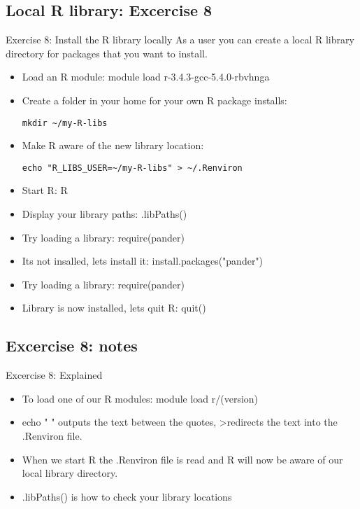 \subsection{Local R library: Excercise 8}
\begin{frame}[fragile]{Exercise 8: Install the R library locally}
As a user you can create a local R library directory for packages that you want to install. 
\begin{itemize}
\item Load an R module: 
module load r-3.4.3-gcc-5.4.0-rbvhnga
\item Create a folder in your home for your own R package installs:
\begin{verbatim}
mkdir ~/my-R-libs
\end{verbatim}
\item Make R aware of the new library location:
\begin{verbatim}
echo "R_LIBS_USER=~/my-R-libs" > ~/.Renviron
\end{verbatim}
\item Start R:
R
\item Display your library paths:
.libPaths()
\item Try loading a library:
require(pander)
\item Its not insalled, lets install it:
install.packages("pander")
\item Try loading a library:
require(pander)
\item Library is now installed, lets quit R:
quit()
\end{itemize}
\end{frame}

\subsection{Excercise 8: notes}
\begin{frame}[fragile]{Excercise 8: Explained}
\begin{itemize}
\item To load one of our R modules: module load r/(version)
\item echo " " outputs the text between the quotes, \textgreater redirects the text into the .Renviron file.
\item When we start R the .Renviron file is read and R will now be aware of our local library directory.
\item .libPaths() is how to check your library locations 
\end{itemize}
\end{frame}

